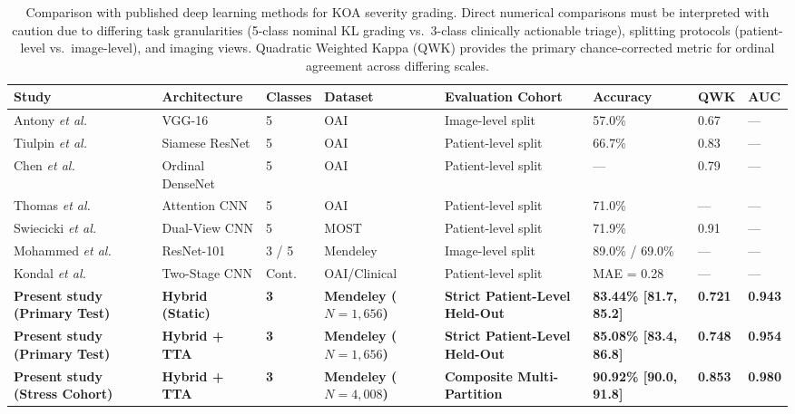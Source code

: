 \documentclass[10pt,journal]{IEEEtran}
\begin{document}
\begin{table}[t]
\centering
\caption{Comparison with published deep learning methods for KOA severity grading. Direct numerical comparisons must be interpreted with caution due to differing task granularities (5-class nominal KL grading vs.\ 3-class clinically actionable triage), splitting protocols (patient-level vs.\ image-level), and imaging views. Quadratic Weighted Kappa (QWK) provides the primary chance-corrected metric for ordinal agreement across differing scales.}
\label{tab:comparison}
\scriptsize
\setlength{\tabcolsep}{4pt}
\renewcommand{\arraystretch}{1.1}
\begin{tabular}{p{3.2cm}p{2.3cm}p{1.0cm}p{2.0cm}p{2.6cm}p{1.8cm}p{1.1cm}p{1.2cm}}
\toprule
\textbf{Study} & \textbf{Architecture} & \textbf{Classes} & \textbf{Dataset} & \textbf{Evaluation Cohort} & \textbf{Accuracy} & \textbf{QWK} & \textbf{AUC} \\
\midrule
Antony \textit{et al.} \cite{antony2016quantifying} & VGG-16 & 5 & OAI & Image-level split & 57.0\% & 0.67 & --- \\
Tiulpin \textit{et al.} \cite{tiulpin2018automatic} & Siamese ResNet & 5 & OAI & Patient-level split & 66.7\% & 0.83 & --- \\
Chen \textit{et al.} \cite{chen2019fully} & Ordinal DenseNet & 5 & OAI & Patient-level split & --- & 0.79 & --- \\
Thomas \textit{et al.} \cite{thomas2020automated} & Attention CNN & 5 & OAI & Patient-level split & 71.0\% & --- & --- \\
Swiecicki \textit{et al.} \cite{swiecicki2021deep} & Dual-View CNN & 5 & MOST & Patient-level split & 71.9\% & 0.91 & --- \\
Mohammed \textit{et al.} \cite{bany2023knee} & ResNet-101 & 3 / 5 & Mendeley & Image-level split & 89.0\% / 69.0\% & --- & --- \\
Kondal \textit{et al.} \cite{kondal2023transfer} & Two-Stage CNN & Cont. & OAI/Clinical & Patient-level split & MAE = 0.28 & --- & --- \\
\midrule
\textbf{Present study (Primary Test)} & \textbf{Hybrid (Static)} & \textbf{3} & \textbf{Mendeley ($N=1{,}656$)} & \textbf{Strict Patient-Level Held-Out} & \textbf{83.44\% [81.7, 85.2]} & \textbf{0.721} & \textbf{0.943} \\
\textbf{Present study (Primary Test)} & \textbf{Hybrid + TTA} & \textbf{3} & \textbf{Mendeley ($N=1{,}656$)} & \textbf{Strict Patient-Level Held-Out} & \textbf{85.08\% [83.4, 86.8]} & \textbf{0.748} & \textbf{0.954} \\
\textbf{Present study (Stress Cohort)} & \textbf{Hybrid + TTA} & \textbf{3} & \textbf{Mendeley ($N=4{,}008$)} & \textbf{Composite Multi-Partition} & \textbf{90.92\% [90.0, 91.8]} & \textbf{0.853} & \textbf{0.980} \\
\bottomrule
\end{tabular}
\end{table}
\end{document}
